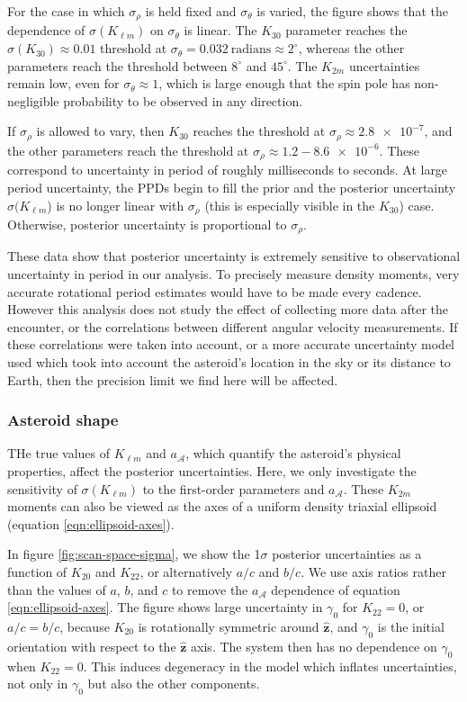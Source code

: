 \documentclass[fleqn,usenatbib]{mnras}
\newcommand{\unit}[1]{\bm{\hat{#1}}}
\begin{document}
For the case in which $\sigma_\rho$ is held fixed and $\sigma_\theta$ is varied, the figure shows that the dependence of $\sigma(K_{\ell m})$ on $\sigma_\theta$ is linear. The $K_{30}$ parameter reaches the $\sigma(K_{30})\approx 0.01$ threshold at $\sigma_\theta = 0.032\ \text{radians} \approx 2^\circ$, whereas the other parameters reach the threshold between $8^\circ$ and $45^\circ$. The $K_{2m}$ uncertainties remain low, even for $\sigma_\theta \approx 1$, which is large enough that the spin pole has non-negligible probability to be observed in any direction.

If $\sigma_\rho$ is allowed to vary, then $K_{30}$ reaches the threshold at $\sigma_\rho \approx \num{2.8e-7}$, and the other parameters reach the threshold at $\sigma_\rho \approx 1.2-\num{8.6e-6}$. These correspond to uncertainty in period of roughly milliseconds to seconds. At large period uncertainty, the PPDs begin to fill the prior and the posterior uncertainty $\sigma(K_{\ell m}$) is no longer linear with $\sigma_\rho$ (this is especially visible in the $K_{30}$) case. Otherwise, posterior uncertainty is proportional to $\sigma_\rho$.

These data show that posterior uncertainty is extremely sensitive to observational uncertainty in period in our analysis. To precisely measure density moments, very accurate rotational period estimates would have to be made every cadence. However this analysis does not study the effect of collecting more data after the encounter, or the correlations between different angular velocity measurements. If these correlations were taken into account, or a more accurate uncertainty model used which took into account the asteroid's location in the sky or its distance to Earth, then the precision limit we find here will be affected.


\subsubsection{Asteroid shape}
\label{sec:scan-shape}

THe true values of $K_{\ell m}$ and $a_\mathcal{A}$, which quantify the asteroid's physical properties, affect the posterior uncertainties. Here, we only investigate the sensitivity of $\sigma(K_{\ell m})$ to the first-order parameters and $a_\mathcal{A}$. These $K_{2m}$ moments can also be viewed as the axes of a uniform density triaxial ellipsoid (equation \ref{eqn:ellipsoid-axes}).

In figure \ref{fig:scan-space-sigma}, we show the 1$\sigma$ posterior uncertainties as a function of $K_{20}$ and $K_{22}$, or alternatively $a/c$ and $b/c$. We use axis ratios rather than the values of $a$, $b$, and $c$ to remove the $a_\mathcal{A}$ dependence of equation \ref{eqn:ellipsoid-axes}. The figure shows large uncertainty in $\gamma_0$ for $K_{22}=0$, or $a/c=b/c$, because $K_{20}$ is rotationally symmetric around $\unit z$, and $\gamma_0$ is the initial orientation with respect to the $\unit z$ axis. The system then has no dependence on $\gamma_0$ when $K_{22}=0$. This induces degeneracy in the model which inflates uncertainties, not only in $\gamma_0$ but also the other components.
\end{document}
